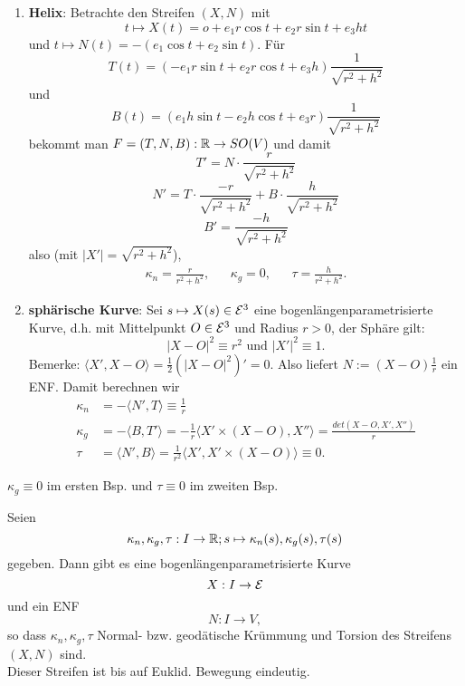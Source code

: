 \begin{example}
	
	\begin{enumerate}
		 \item \textbf{Helix}: Betrachte den Streifen $(X,N)$ mit $$t \mapsto X(t) = o + e_1r\cos t + e_2r \sin t + e_3ht$$ und 
		$t \mapsto N(t) = -(e_1\cos t + e_2 \sin t)$.
		Für $$T(t) = (-e_1r\sin t + e_2r \cos t + e_3h) \frac{1}{\sqrt{r^2 + h^2}}$$ und
		$$B(t) = (e_1h\sin t - e_2h \cos t + e_3r) \frac{1}{\sqrt{r^2 + h^2}}$$ bekommt man
		$F = (T,N,B): \mathbb R \rightarrow SO(V)$ und damit \[ T' = N \cdot \frac{r}{\sqrt{r^2 + h^2}} \]		\[ N' = T \cdot \frac{-r}{\sqrt{r^2 + h^2}} + B \cdot \frac{h}{\sqrt{r^2 + h^2}} \]	
		\[B'= \frac{-h}{\sqrt{r^2 +h^2}}\]
		also (mit $|X'|=\sqrt{r^2 + h^2}$),
		\begin{align*}
		\kappa_n  = \frac{r}{r^2 + h^2}, &&
		\kappa_g  = 0, &&
		\tau = \frac{h}{r^2+ h^2}. 
		\end{align*} 
		
		\item \textbf{sphärische Kurve}: Sei $s\mapsto X(s) \in \mathcal E^3$ eine bogenlängenparametrisierte Kurve, d.h. mit Mittelpunkt $O \in \mathcal E^3$ und Radius $r>0$, der Sphäre gilt:
		\[ |X-O|^2 \equiv r^2 \text{ und } |X'|^2 \equiv 1  .\]
		Bemerke:
		$\langle X',X-O \rangle = \frac 12 (|X-O|^2)' = 0  .$
		Also liefert $N :=(X-O)\frac 1r $ ein ENF. Damit berechnen wir
		\begin{align*}
			\kappa_n &= - \langle N', T \rangle \equiv \frac 1r\\
			\kappa_g &= - \langle B, T' \rangle = - \frac 1r \langle X' \times (X-O), X'' \rangle = \frac{det(X-O,X',X'')}{r}\\
			\tau &= \langle N',B\rangle = \frac{1}{r^2} \langle X',X'\times (X-O) \rangle \equiv 0  .
			\end{align*}
		 
	\end{enumerate}

\end{example}

\begin{remark}
	$\kappa_g \equiv 0$ im ersten Bsp. und $\tau \equiv 0$ im zweiten Bsp.
\end{remark}

\begin{theorem}
	Seien $$\kappa_n, \kappa_g, \tau: I \rightarrow \mathbb R; s \mapsto \kappa_n(s), \kappa_g(s), \tau(s)$$ gegeben. Dann gibt es eine bogenlängenparametrisierte Kurve $$X: I \rightarrow \mathcal E$$ und ein ENF $$N: I \rightarrow V  ,$$ so dass $\kappa_n, \kappa_g, \tau$ Normal- bzw. geodätische Krümmung und Torsion des Streifens $(X,N)$ sind.\\ Dieser Streifen ist bis auf Euklid. Bewegung eindeutig.
\end{theorem}

